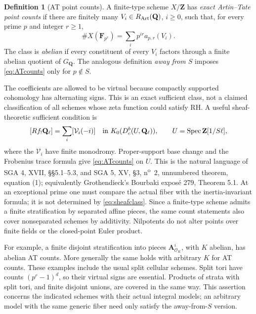 \documentclass[11pt,a4paper]{article}
\theoremstyle{definition}
\newtheorem{definition}[theorem]{Definition}
\begin{document}
\begin{definition}[AT point counts]
A finite-type scheme $X/\mathbf Z$ has \emph{exact Artin--Tate point
counts} if there are finitely many $V_i\in R_{\rm Art}(\mathbf Q)$,
$i\geq0$, such that, for every prime $p$ and integer $r\geq1$,
\begin{equation}\label{eq:ATcounts}
 \#X(\mathbf F_{p^r})=\sum_i p^{ir}a_{p,r}(V_i).
\end{equation}
The class is \emph{abelian} if every constituent of every $V_i$ factors
through a finite abelian quotient of $G_{\mathbf Q}$.
The analogous definition \emph{away from $S$} imposes
\eqref{eq:ATcounts} only for $p\notin S$.
\end{definition}

The coefficients are allowed to be virtual because compactly supported
cohomology has alternating signs.  This is an exact sufficient class,
not a claimed classification of all schemes whose zeta function could
satisfy RH.  A useful sheaf-theoretic sufficient condition is
\begin{equation}\label{eq:sheafclass}
 [Rf_!\mathbf Q_\ell]=\sum_i[\mathcal V_i(-i)]
 \quad\hbox{in }K_0(D^b_c(U,\mathbf Q_\ell)),
 \qquad U=\operatorname{Spec}\mathbf Z[1/S\ell],
\end{equation}
where the $\mathcal V_i$ have finite monodromy.  Proper-support base
change and the Frobenius trace formula give \eqref{eq:ATcounts} on $U$.
This is the natural language of SGA 4, XVII, \S\S5.1--5.3, and SGA 5,
XV, \S3, n\textsuperscript{o}~2, unnumbered theorem, equation (1);
equivalently Grothendieck's Bourbaki
expos\'e 279, Theorem 5.1.  At an exceptional prime one must compare the
actual fiber with the inertia-invariant formula; it is not determined
by \eqref{eq:sheafclass}.  Since a finite-type scheme admits a finite
stratification by separated affine pieces, the same count statements
also cover nonseparated schemes by additivity.  Nilpotents do not alter
points over finite fields or the closed-point Euler product.

For example, a finite disjoint stratification into pieces
$\mathbf A^{i}_{\mathcal O_K}$, with $K$ abelian, has abelian AT counts.
More generally the same holds with arbitrary $K$ for AT counts.  These
examples include the usual split cellular schemes.  Split tori have
counts $(p^r-1)^d$, so their virtual signs are essential.  Products of
strata with split tori, and finite disjoint unions, are covered in the
same way.  This assertion concerns the indicated schemes with their
actual integral models; an arbitrary model with the same generic fiber
need only satisfy the away-from-$S$ version.
\end{document}
